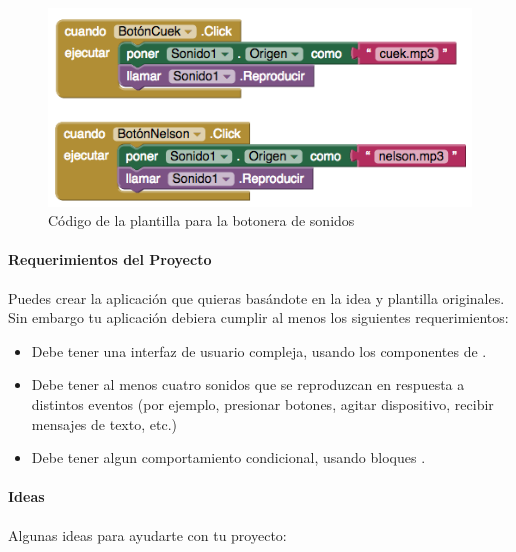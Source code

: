 \documentclass[letterpaper]{article}
\begin{document}
\begin{figure}[H]
\centering
\includegraphics[scale=0.25]{figures/BotoneraCode}
\caption{Código de la plantilla para la botonera de sonidos}
\label{fig:botoneraCode}
\end{figure}

\paragraph{Requerimientos del Proyecto}

Puedes crear la aplicación que quieras basándote en la idea y
plantilla originales. Sin embargo tu aplicación debiera cumplir al
menos los siguientes requerimientos:

\begin{itemize}

\item Debe tener una interfaz de usuario compleja, usando los
  componentes de .

\item Debe tener al menos cuatro sonidos que se reproduzcan en
  respuesta a distintos eventos (por ejemplo, presionar botones,
  agitar dispositivo, recibir mensajes de texto, etc.)

\item Debe tener algun comportamiento condicional, usando bloques
  .

\end{itemize}

\paragraph{Ideas} Algunas ideas para ayudarte con tu proyecto:
\end{document}
